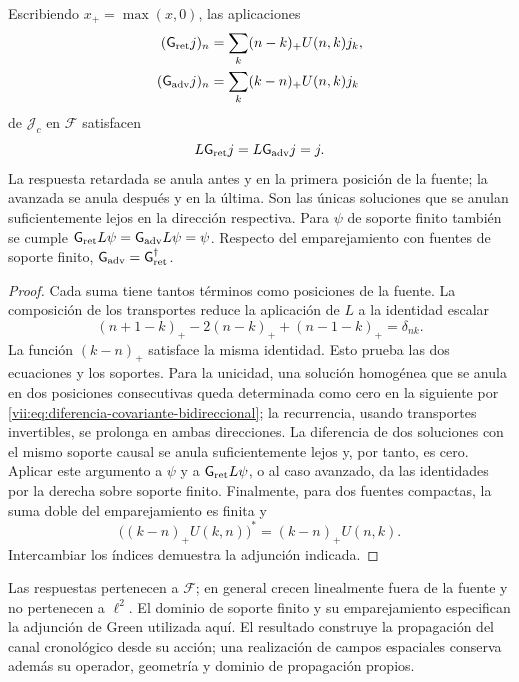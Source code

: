 \begin{theorem}
\label{vii:thm:green-cronologico}
Escribiendo \(x_+=\max(x,0)\), las aplicaciones
\begin{align}
 (\mathsf{G}_{\rm ret}j)_n&=\sum_k(n-k)_+U(n,k)j_k,\label{vii:eq:green-ret-cronologico}\\
 (\mathsf{G}_{\rm adv}j)_n&=\sum_k(k-n)_+U(n,k)j_k\label{vii:eq:green-adv-cronologico}
\end{align}
de \(\mathcal J_c\) en \(\mathcal F\) satisfacen
\[
 L\mathsf{G}_{\rm ret}j=L\mathsf{G}_{\rm adv}j=j.
\]
La respuesta retardada se anula antes y en la primera posición de la
fuente; la avanzada se anula después y en la última. Son las únicas
soluciones que se anulan suficientemente lejos en la dirección respectiva.
Para \(\psi\) de soporte finito también se cumple
\(\mathsf{G}_{\rm ret}L\psi=\mathsf{G}_{\rm adv}L\psi=\psi\).
Respecto del emparejamiento con fuentes de soporte finito,
\(\mathsf{G}_{\rm adv}=\mathsf{G}_{\rm ret}^{\dagger}\).
\end{theorem}
\begin{proof}
Cada suma tiene tantos términos como posiciones de la fuente.
La composición de los transportes reduce la aplicación de \(L\) a
la identidad escalar
\[
 (n+1-k)_+-2(n-k)_++(n-1-k)_+=\delta_{nk}.
\]
La función \((k-n)_+\) satisface la misma identidad. Esto prueba
las dos ecuaciones y los soportes. Para la unicidad, una solución
homogénea que se anula en dos posiciones consecutivas queda determinada
como cero en la siguiente por \eqref{vii:eq:diferencia-covariante-bidireccional};
la recurrencia, usando transportes invertibles, se prolonga en ambas
direcciones. La diferencia de dos soluciones con el mismo soporte causal
se anula suficientemente lejos y, por tanto, es cero.
Aplicar este argumento a \(\psi\) y a \(\mathsf{G}_{\rm ret}L\psi\), o al
caso avanzado, da las identidades por la derecha sobre soporte finito.
Finalmente, para dos fuentes compactas, la suma doble del emparejamiento
es finita y
\[
 \bigl((k-n)_+U(k,n)\bigr)^*=(k-n)_+U(n,k).
\]
Intercambiar los índices demuestra la adjunción indicada.
\end{proof}

Las respuestas pertenecen a \(\mathcal F\); en general crecen
linealmente fuera de la fuente y no pertenecen a \(\ell^2\).
El dominio de soporte finito y su emparejamiento especifican la adjunción
de Green utilizada aquí. El resultado construye la propagación del canal
cronológico desde su acción; una realización de campos espaciales conserva
además su operador, geometría y dominio de propagación propios.

